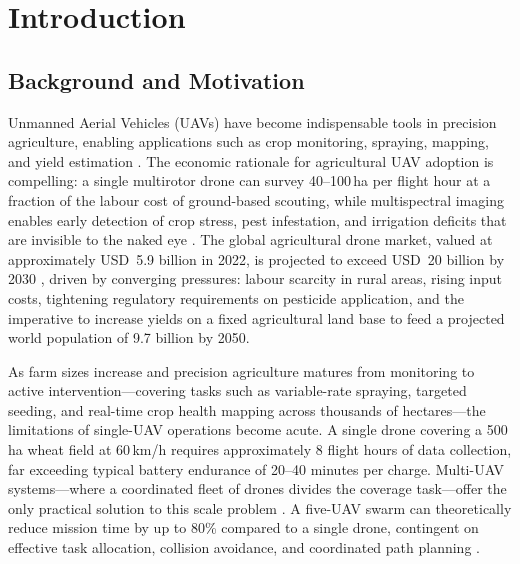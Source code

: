 \documentclass[review,3p,times]{elsarticle}
\begin{document}
\section{Introduction}

\subsection{Background and Motivation}

Unmanned Aerial Vehicles (UAVs) have become indispensable tools in precision agriculture, enabling applications such as crop monitoring, spraying, mapping, and yield estimation \cite{zhang2012,tsouros2019,puri2017,mogili2018,hunt2018}. The economic rationale for agricultural UAV adoption is compelling: a single multirotor drone can survey 40--100\,ha per flight hour at a fraction of the labour cost of ground-based scouting, while multispectral imaging enables early detection of crop stress, pest infestation, and irrigation deficits that are invisible to the naked eye \cite{hunt2018,zhang2012}. The global agricultural drone market, valued at approximately USD~5.9 billion in 2022, is projected to exceed USD~20 billion by 2030 \cite{tsouros2019,mogili2018}, driven by converging pressures: labour scarcity in rural areas, rising input costs, tightening regulatory requirements on pesticide application, and the imperative to increase yields on a fixed agricultural land base to feed a projected world population of 9.7 billion by 2050.

As farm sizes increase and precision agriculture matures from monitoring to active intervention---covering tasks such as variable-rate spraying, targeted seeding, and real-time crop health mapping across thousands of hectares---the limitations of single-UAV operations become acute. A single drone covering a 500\,ha wheat field at 60\,km/h requires approximately 8 flight hours of data collection, far exceeding typical battery endurance of 20--40 minutes per charge. Multi-UAV systems---where a coordinated fleet of drones divides the coverage task---offer the only practical solution to this scale problem \cite{chung2018,gupta2016}. A five-UAV swarm can theoretically reduce mission time by up to 80\% compared to a single drone, contingent on effective task allocation, collision avoidance, and coordinated path planning \cite{chung2018}.
\end{document}
